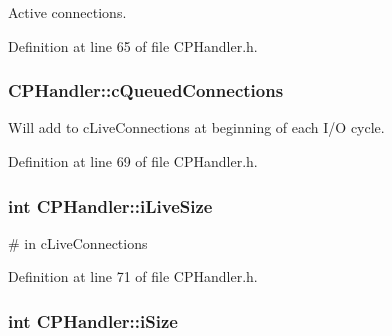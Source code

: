 \-Active connections. 



\-Definition at line 65 of file \-C\-P\-Handler.\-h.

\hypertarget{class_c_p_handler_acf71b63ae0b5079e1f8e37cba56f27ea}{
\subsubsection[{c\-Queued\-Connections}]{ {\bf \-C\-P\-Handler\-::c\-Queued\-Connections}}}\label{class_c_p_handler_acf71b63ae0b5079e1f8e37cba56f27ea}


\-Will add to c\-Live\-Connections at beginning of each \-I/\-O cycle. 



\-Definition at line 69 of file \-C\-P\-Handler.\-h.

\hypertarget{class_c_p_handler_a23f12318d15c18c8d921efdc80626da4}{
\subsubsection[{i\-Live\-Size}]{\setlength{\rightskip}{0pt plus 5cm}int {\bf \-C\-P\-Handler\-::i\-Live\-Size}}}\label{class_c_p_handler_a23f12318d15c18c8d921efdc80626da4}


\# in c\-Live\-Connections 



\-Definition at line 71 of file \-C\-P\-Handler.\-h.

\hypertarget{class_c_p_handler_acc98aa0cf09e8d132f239b131a5773da}{
\subsubsection[{i\-Size}]{\setlength{\rightskip}{0pt plus 5cm}int {\bf \-C\-P\-Handler\-::i\-Size}}}\label{class_c_p_handler_acc98aa0cf09e8d132f239b131a5773da}



